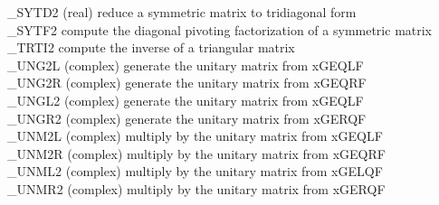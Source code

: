 \begin{tabbing}
\_SYTD2 \> (real) reduce a symmetric matrix to tridiagonal form \\
\_SYTF2 \> compute the diagonal pivoting factorization of a symmetric matrix \\
\_TRTI2 \> compute the inverse of a triangular matrix \\
\_UNG2L \> (complex) generate the unitary matrix from xGEQLF \\
\_UNG2R \> (complex) generate the unitary matrix from xGEQRF \\
\_UNGL2 \> (complex) generate the unitary matrix from xGEQLF \\
\_UNGR2 \> (complex) generate the unitary matrix from xGERQF \\
\_UNM2L \> (complex) multiply by the unitary matrix from xGEQLF \\
\_UNM2R \> (complex) multiply by the unitary matrix from xGEQRF \\
\_UNML2 \> (complex) multiply by the unitary matrix from xGELQF \\
\_UNMR2 \> (complex) multiply by the unitary matrix from xGERQF
\end{tabbing}


